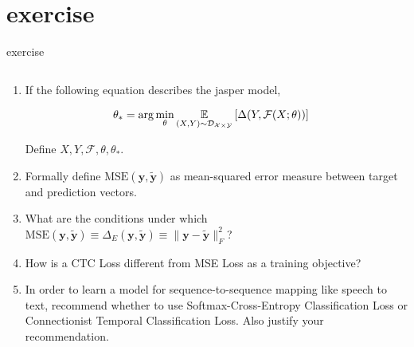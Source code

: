 \documentclass[aspectratio=169,xcolor={dvipsnames,svgnames}]{beamer}
\begin{document}
\section{exercise}
\label{sec:org50b9da9}
\begin{frame}[label={sec:exercise}]{exercise}
\begin{columns}
\begin{column}{0.45\columnwidth}
\begin{enumerate}[<only@+>]
\item If the following equation describes the jasper
model,

\begin{align}
  \notag
  \theta_*
  &= \arg\min_{\theta} \underset {(X,Y) \sim
    \mathcal{D}_{\mathcal{X}\times\mathcal{Y}}}
    {\mathbb{E}} \left[ \Delta(Y,
    \mathcal{F}(X;\theta)) \right]
\end{align}

Define \(X, Y, \mathcal{F}, \theta, \theta_*\).
\item Formally define \(\mathrm{MSE} (\mathbf{y},
   \widetilde{\mathbf{y}})\) as mean-squared error
measure between target and prediction vectors.
\item What are the conditions under which \(\mathrm{MSE}
   (\mathbf{y}, \widetilde{\mathbf{y}}) \equiv \Delta_E
   (\mathbf{y}, \widetilde{\mathbf{y}}) \equiv
   \|\mathbf{y} - \widetilde{\mathbf{y}}\|_F^2\)?
\item How is a CTC Loss different from MSE Loss as a
training objective?
\item In order to learn a model for sequence-to-sequence
mapping like speech to text, recommend whether to
use Softmax-Cross-Entropy Classification Loss or
Connectionist Temporal Classification Loss.  Also
justify your recommendation.
\end{enumerate}
\end{column}
\end{columns}
\end{frame}
\end{document}
